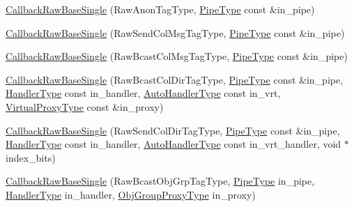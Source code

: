 \begin{DoxyCompactItemize}
\item 
\hyperlink{structvt_1_1pipe_1_1callback_1_1cbunion_1_1_callback_raw_base_single_a2586495207c03c2fb5247e19ee189984}{Callback\+Raw\+Base\+Single} (Raw\+Anon\+Tag\+Type, \hyperlink{namespacevt_ac9852acda74d1896f48f406cd72c7bd3}{Pipe\+Type} const \&in\+\_\+pipe)
\item 
\hyperlink{structvt_1_1pipe_1_1callback_1_1cbunion_1_1_callback_raw_base_single_ada70fbd67b17be3a4eb86fd497b2c409}{Callback\+Raw\+Base\+Single} (Raw\+Send\+Col\+Msg\+Tag\+Type, \hyperlink{namespacevt_ac9852acda74d1896f48f406cd72c7bd3}{Pipe\+Type} const \&in\+\_\+pipe)
\item 
\hyperlink{structvt_1_1pipe_1_1callback_1_1cbunion_1_1_callback_raw_base_single_a1bdc68ca7ce795dc6acbc0b42a97216f}{Callback\+Raw\+Base\+Single} (Raw\+Bcast\+Col\+Msg\+Tag\+Type, \hyperlink{namespacevt_ac9852acda74d1896f48f406cd72c7bd3}{Pipe\+Type} const \&in\+\_\+pipe)
\item 
\hyperlink{structvt_1_1pipe_1_1callback_1_1cbunion_1_1_callback_raw_base_single_a750671c1804c21f4cd981f7a27d7177a}{Callback\+Raw\+Base\+Single} (Raw\+Bcast\+Col\+Dir\+Tag\+Type, \hyperlink{namespacevt_ac9852acda74d1896f48f406cd72c7bd3}{Pipe\+Type} const \&in\+\_\+pipe, \hyperlink{namespacevt_af64846b57dfcaf104da3ef6967917573}{Handler\+Type} const in\+\_\+handler, \hyperlink{structvt_1_1pipe_1_1callback_1_1cbunion_1_1_callback_raw_base_single_a734a9c83099de5bc1cd85f9da8dba7bb}{Auto\+Handler\+Type} const in\+\_\+vrt, \hyperlink{namespacevt_a1b417dd5d684f045bb58a0ede70045ac}{Virtual\+Proxy\+Type} const \&in\+\_\+proxy)
\item 
\hyperlink{structvt_1_1pipe_1_1callback_1_1cbunion_1_1_callback_raw_base_single_a1b045f50fce73d1bd4347cb2de6e45f5}{Callback\+Raw\+Base\+Single} (Raw\+Send\+Col\+Dir\+Tag\+Type, \hyperlink{namespacevt_ac9852acda74d1896f48f406cd72c7bd3}{Pipe\+Type} const \&in\+\_\+pipe, \hyperlink{namespacevt_af64846b57dfcaf104da3ef6967917573}{Handler\+Type} const in\+\_\+handler, \hyperlink{structvt_1_1pipe_1_1callback_1_1cbunion_1_1_callback_raw_base_single_a734a9c83099de5bc1cd85f9da8dba7bb}{Auto\+Handler\+Type} const in\+\_\+vrt\+\_\+handler, void $\ast$index\+\_\+bits)
\item 
\hyperlink{structvt_1_1pipe_1_1callback_1_1cbunion_1_1_callback_raw_base_single_a2ff2eebe15a6b270473f61cfa2a9804a}{Callback\+Raw\+Base\+Single} (Raw\+Bcast\+Obj\+Grp\+Tag\+Type, \hyperlink{namespacevt_ac9852acda74d1896f48f406cd72c7bd3}{Pipe\+Type} in\+\_\+pipe, \hyperlink{namespacevt_af64846b57dfcaf104da3ef6967917573}{Handler\+Type} in\+\_\+handler, \hyperlink{namespacevt_ad7cae989df485fccca57f0792a880a8e}{Obj\+Group\+Proxy\+Type} in\+\_\+proxy)

\end{DoxyCompactItemize}

